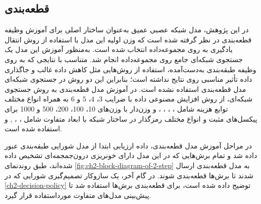 \begin{table}[h]
\centering
\caption{ضرایب مورد استفاده در جستجوی شبکه‌ای}
\label{table:ch2-grid-values}
\end{table}

\subsection{قطعه‌بندی}
در این پژوهش،‌ مدل شبکه عصبی عمیق 
به‌عنوان ساختار اصلی برای آموزش وظیفه قطعه‌بندی در نظر گرفته شده است که وزن‌ اولیه این مدل با استفاده از روش انتقال یادگیری به روی مجموعه‌داده 
\cite{deng2009imagenet}
انتخاب شده است. به‌منظور آموزش این مدل یک جستجوی شبکه‌ای جامع روی مجموعه‌داده انجام شد. متناسب با نتایجی که به روی وظیفه طبقه‌بندی به‌دست‌آمده، استفاده از روش‌هایی مثل کاهش داده غالب و جاگذاری داده تأثیر  مناسبی روی نتایج نداشته است؛ بنابراین این دو روش در جستجوی شبکه‌ای مدل قطعه‌بندی استفاده نشده است. در آموزش مدل قطعه‌بندی به روش جستجوی شبکه‌ای، از روش افزایش مصنوعی داده با ضرایب 
$3$، $4$، $5$ و $6$
به همراه انواع مختلف توابع هزینه شامل 
، ، ، ،   و
وزن‌دار با وزن‌های 10، 100،‌ 200، 500 و 1000 برای پیکسل‌های مثبت و انواع مختلف رمزگذار در ساختار شبکه 
با ابعاد متفاوت شامل 
، ، , 
و 
استفاده شده است.

در مراحل آموزش مدل قطعه‌بندی، داده ارزیابی ابتدا از مدل شورایی طبقه‌بندی عبور داده شد و تمام برش‌هایی که در این مدل دارای خونریزی درون‌جمجمه‌ای تشخیص داده شده‌اند،‌ طبق روندنمای 
\autoref{fig:ch2-block-diagram-of-2-step}
به مدل قطعه‌بندی ارسال شدند تا برش‌ها قطعه‌بندی شوند.
در گام آخر، یک سازوکار تصمیم‌گیری شورایی که در 
\autoref{ch2-decision-policy}
توضیح داده شده است، 
برای قطعه‌بندی برش‌ها استفاده شد تا پیش‌بینی مدل‌های متفاوت مورداستفاده قرار گیرد.



